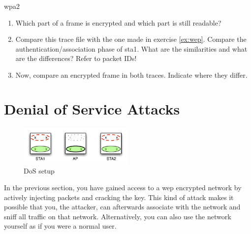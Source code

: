 \begin{exercise}{\acs{wpa}2}
\begin{enumerate}
		\begin{esolution}
		\end{esolution}
	\item Which part of a frame is encrypted and which part is still readable?\newline
		\begin{esolution}
		\end{esolution}
		\item Compare this trace file with the one made in exercise \ref{ex:wep}. Compare the authentication/association phase of \ac{sta}1. What are the similarities and what are the differences? Refer to packet IDs!\newline
		\begin{esolution}
		\end{esolution}
		\item Now, compare an encrypted frame in both traces. Indicate where they differ.\newline
		\begin{esolution}
		\end{esolution}
\end{enumerate}

\end{exercise}



\section{Denial of Service Attacks}

\begin{figure}[h!]
		\begin{center}
			\includegraphics[width=0.5\textwidth]{images/wepcrack2.pdf}
			\caption{DoS setup} 
			\label{fig:dos} 
		\end{center}
	\end{figure}

In the previous section, you have gained access to a \ac{wep} encrypted network by actively injecting packets and cracking the key. This kind of attack makes it possible that you, the attacker, can afterwards associate with the network and sniff all traffic on that network. Alternatively, you can also use the network yourself as if you were a normal user.

